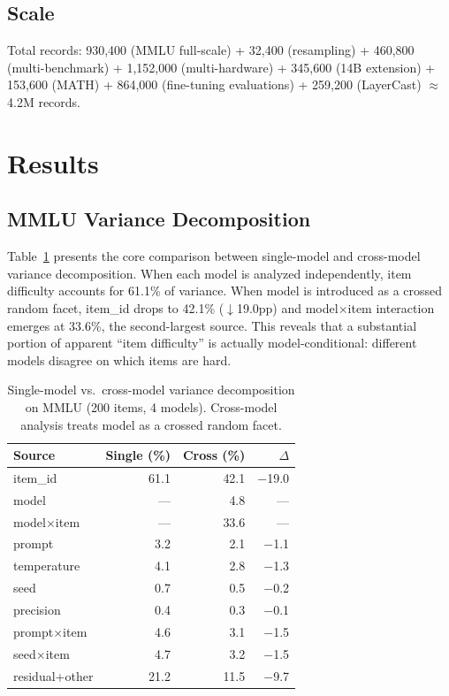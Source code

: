 \documentclass[11pt,a4paper]{article}
\begin{document}
\subsection{Scale}
Total records: 930,400 (MMLU full-scale) + 32,400 (resampling) + 460,800 (multi-benchmark) + 1,152,000 (multi-hardware) + 345,600 (14B extension) + 153,600 (MATH) + 864,000 (fine-tuning evaluations) + 259,200 (LayerCast) $\approx$ 4.2M records.

\section{Results}

\subsection{MMLU Variance Decomposition}
\label{sec:mmlu}

Table~\ref{tab:single-cross} presents the core comparison between single-model and cross-model variance decomposition.
When each model is analyzed independently, item difficulty accounts for 61.1\% of variance.
When model is introduced as a crossed random facet, item\_id drops to 42.1\% ($\downarrow$19.0pp) and model$\times$item interaction emerges at 33.6\%, the second-largest source.
This reveals that a substantial portion of apparent ``item difficulty'' is actually model-conditional: different models disagree on which items are hard.

\begin{table}[t]
\centering
\caption{Single-model vs.\ cross-model variance decomposition on MMLU (200 items, 4 models). Cross-model analysis treats model as a crossed random facet.}
\label{tab:single-cross}
\small
\begin{tabular}{lrrr}
\toprule
\textbf{Source} & \textbf{Single (\%)} & \textbf{Cross (\%)} & \textbf{$\Delta$} \\
\midrule
item\_id       & 61.1 & 42.1 & $-$19.0 \\
model          & ---  &  4.8 & --- \\
model$\times$item & --- & 33.6 & --- \\
prompt         &  3.2 &  2.1 & $-$1.1 \\
temperature    &  4.1 &  2.8 & $-$1.3 \\
seed           &  0.7 &  0.5 & $-$0.2 \\
precision      &  0.4 &  0.3 & $-$0.1 \\
prompt$\times$item & 4.6 & 3.1 & $-$1.5 \\
seed$\times$item   & 4.7 & 3.2 & $-$1.5 \\
residual+other & 21.2 & 11.5 & $-$9.7 \\
\bottomrule
\end{tabular}
\end{table}
\end{document}
